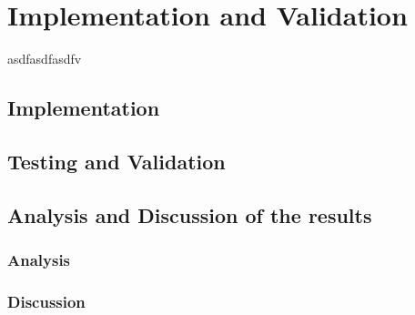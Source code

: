 \chapter{Implementation and Validation}%
asdfasdfasdfv
\section{Implementation}%

\section{Testing and Validation}%

\section{Analysis and Discussion of the results}%


\subsection{Analysis}
\subsection{Discussion}%